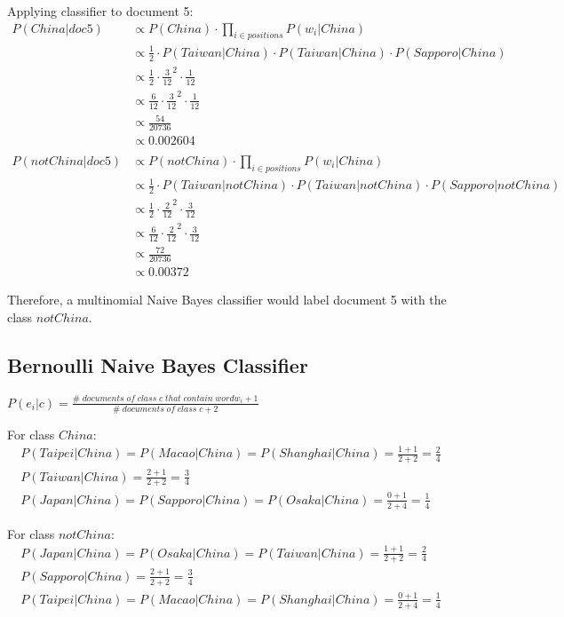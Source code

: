 \documentclass{article}
\begin{document}
Applying classifier to document 5:
\begin{align}
	P(China|doc5) & \propto P(China) \cdot \prod_{i \in positions} {P(w_i|China)} \\
	& \propto \frac{1}{2} \cdot P(Taiwan|China) \cdot P(Taiwan|China) \cdot P(Sapporo|China) \\
	& \propto \frac{1}{2} \cdot \frac{3}{12}^2 \cdot \frac{1}{12} \\
	& \propto \frac{6}{12} \cdot \frac{3}{12}^2 \cdot \frac{1}{12} \\
	& \propto \frac{54}{20736} \\
	& \propto 0.002604 \\
	& \nonumber \\ 
	P(notChina|doc5) & \propto P(notChina) \cdot \prod_{i \in positions} {P(w_i|China)} \\
	& \propto \frac{1}{2} \cdot P(Taiwan|notChina) \cdot P(Taiwan|notChina) \cdot P(Sapporo|notChina) \\
	& \propto \frac{1}{2} \cdot \frac{2}{12}^2 \cdot \frac{3}{12} \\
	& \propto \frac{6}{12} \cdot \frac{2}{12}^2 \cdot \frac{3}{12} \\	
	& \propto \frac{72}{20736} \\
	& \propto 0.00372
\end{align}

Therefore, a multinomial Naive Bayes classifier would label document 5 with the class $notChina$.

\subsection{Bernoulli Naive Bayes Classifier}

$P(e_i|c) = \frac{\#\;documents\;of\;class\;c\;that\;contain\;word w_i + 1}{\#\;documents\;of\;class\;c + 2}$

For class $China$:
\begin{align}
P(Taipei|China) = P(Macao|China) = P(Shanghai|China) = \frac{1 + 1}{2 + 2} = \frac{2}{4} \\
P(Taiwan|China) = \frac{2 + 1}{2 + 2} = \frac{3}{4} \\
P(Japan|China) = P(Sapporo|China) = P(Osaka|China) = \frac{0 + 1}{2 + 4} = \frac{1}{4}
\end{align}

For class $notChina$:
\begin{align}
P(Japan|China) = P(Osaka|China) = P(Taiwan|China) = \frac{1 + 1}{2 + 2} = \frac{2}{4} \\
P(Sapporo|China) = \frac{2 + 1}{2 + 2} = \frac{3}{4} \\
P(Taipei|China) = P(Macao|China) = P(Shanghai|China) = \frac{0 + 1}{2 + 4} = \frac{1}{4}
\end{align}
\end{document}
